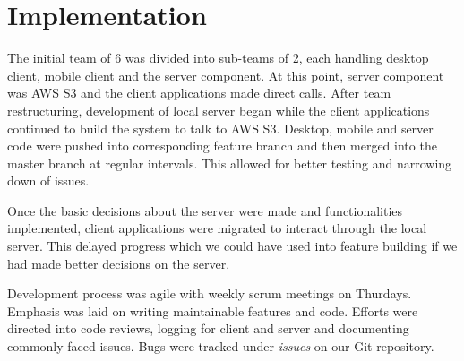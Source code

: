 \section{Implementation}

The initial team of 6 was divided into sub-teams of 2, each handling desktop client, mobile client and the server component. At this point, server component was AWS S3 and the client applications made direct calls. After team restructuring, development of local server began while the client applications continued to build the system to talk to AWS S3. Desktop, mobile and server code were pushed into corresponding feature branch and then merged into the master branch at regular intervals. This allowed for better testing and narrowing down of issues.\newline

Once the basic decisions about the server were made and functionalities implemented, client applications were migrated to interact through the local server. This delayed progress which we could have used into feature building if we had made better decisions on the server.\newline

Development process was agile with weekly scrum meetings on Thurdays. Emphasis was laid on writing maintainable features and code. Efforts were directed into code reviews, logging for client and server and documenting commonly faced issues. Bugs were tracked under \emph{issues} on our Git repository.\newline

